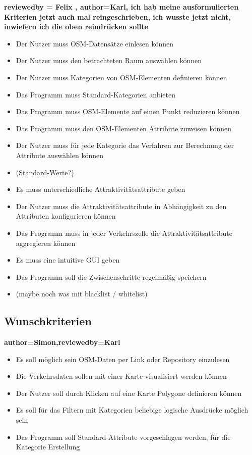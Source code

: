 \documentclass[parskip=full]{scrartcl} %
\begin{document}
\textbf{reviewedby = Felix , author=Karl, ich hab meine ausformulierten Kriterien jetzt auch mal reingeschrieben, ich wusste jetzt nicht, inwiefern ich die oben reindrücken sollte\\}
\begin{itemize}
    \item Der Nutzer muss OSM-Datensätze einlesen können
    \item Der Nutzer muss den betrachteten Raum auswählen können
    \item Der Nutzer muss Kategorien von OSM-Elementen definieren können
    \item Das Programm muss Standard-Kategorien anbieten
    \item Das Programm muss OSM-Elemente auf einen Punkt reduzieren können
    \item Das Programm muss den OSM-Elementen Attribute zuweisen können
    \item Der Nutzer muss für jede Kategorie das Verfahren zur Berechnung der Attribute auswählen können
    \item (Standard-Werte?)
    \item Es muss unterschiedliche Attraktivitätsattribute geben
    \item Der Nutzer muss die Attraktivitätsattribute in Abhängigkeit zu den Attributen konfigurieren können
    \item Das Programm muss in jeder Verkehrszelle die Attraktivitätsattribute aggregieren können
    \item Es muss eine intuitive GUI geben
    \item Das Programm soll die Zwischenschritte regelmäßig speichern
    \item (maybe noch was mit blacklist / whitelist)
\end{itemize}


\subsection{Wunschkriterien}
\textbf{author=Simon,reviewedby=Karl\\}
\begin{itemize}
    \item Es soll möglich sein OSM-Daten per Link oder Repository einzulesen
    \item Die Verkehrsdaten sollen mit einer Karte visualisiert werden können
    \item Der Nutzer soll durch Klicken auf eine Karte Polygone definieren können
    \item Es soll für das Filtern mit Kategorien beliebige logische Ausdrücke möglich sein
    \item Das Programm soll Standard-Attribute vorgeschlagen werden, für die Kategorie Erstellung
\end{itemize}
\end{document}
